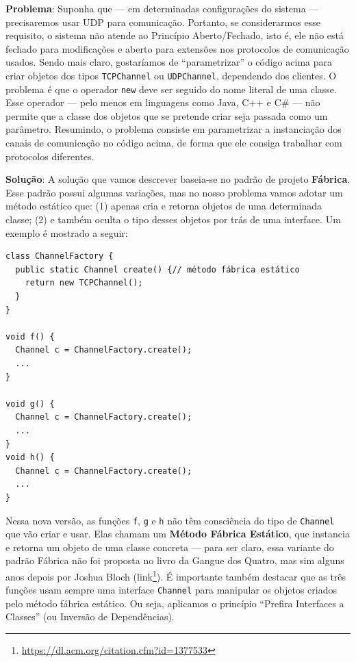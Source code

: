 \documentclass[
  11pt,
  twoside]{book}
\newcommand{\passthrough}[1]{#1}
\DeclareRobustCommand{\href}[2]{#2\footnote{\url{#1}}}
\begin{document}
\textbf{Problema}: Suponha que --- em determinadas configurações do
sistema --- precisaremos usar UDP para comunicação. Portanto, se
considerarmos esse requisito, o sistema não atende ao Princípio
Aberto/Fechado, isto é, ele não está fechado para modificações e aberto
para extensões nos protocolos de comunicação usados. Sendo mais claro,
gostaríamos de ``parametrizar'' o código acima para criar objetos dos
tipos \passthrough{\lstinline!TCPChannel!} ou
\passthrough{\lstinline!UDPChannel!}, dependendo dos clientes. O
problema é que o operador \passthrough{\lstinline!new!} deve ser seguido
do nome literal de uma classe. Esse operador --- pelo menos em
linguagens como Java, C++ e C\# --- não permite que a classe dos objetos
que se pretende criar seja passada como um parâmetro. Resumindo, o
problema consiste em parametrizar a instanciação dos canais de
comunicação no código acima, de forma que ele consiga trabalhar com
protocolos diferentes.

\textbf{Solução}: A solução que vamos descrever baseia-se no padrão de
projeto \textbf{Fábrica}. Esse padrão possui algumas variações, mas no
nosso problema vamos adotar um método estático que: (1) apenas cria e
retorna objetos de uma determinada classe; (2) e também oculta o tipo
desses objetos por trás de uma interface. Um exemplo é mostrado a
seguir:

\begin{lstlisting}
class ChannelFactory {
  public static Channel create() {// método fábrica estático
    return new TCPChannel();
  }
}

void f() {
  Channel c = ChannelFactory.create();  
  ...
}

void g() {
  Channel c = ChannelFactory.create();
  ...
}
void h() {
  Channel c = ChannelFactory.create();
  ...
}
\end{lstlisting}

 
Nessa nova versão, as funções \passthrough{\lstinline!f!},
\passthrough{\lstinline!g!} e \passthrough{\lstinline!h!} não têm
consciência do tipo de \passthrough{\lstinline!Channel!} que vão criar e
usar. Elas chamam um \textbf{Método Fábrica Estático}, que instancia e
retorna um objeto de uma classe concreta --- para ser claro, essa
variante do padrão Fábrica não foi proposta no livro da Gangue dos
Quatro, mas sim alguns anos depois por Joshua Bloch
(\href{https://dl.acm.org/citation.cfm?id=1377533}{link}). É importante
também destacar que as três funções usam sempre uma interface
\passthrough{\lstinline!Channel!} para manipular os objetos criados pelo
método fábrica estático. Ou seja, aplicamos o princípio ``Prefira
Interfaces a Classes'' (ou Inversão de Dependências).
\end{document}
